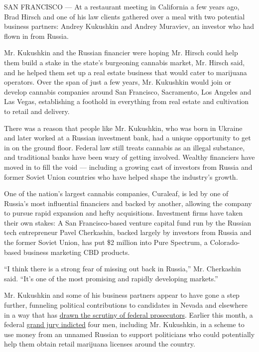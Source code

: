 SAN FRANCISCO --- At a restaurant meeting in California a few years ago,
Brad Hirsch and one of his law clients gathered over a meal with two
potential business partners: Andrey Kukushkin and Andrey Muraviev, an
investor who had flown in from Russia.

Mr. Kukushkin and the Russian financier were hoping Mr. Hirsch could
help them build a stake in the state's burgeoning cannabis market, Mr.
Hirsch said, and he helped them set up a real estate business that would
cater to marijuana operators. Over the span of just a few years, Mr.
Kukushkin would join or develop cannabis companies around San Francisco,
Sacramento, Los Angeles and Las Vegas, establishing a foothold in
everything from real estate and cultivation to retail and delivery.

There was a reason that people like Mr. Kukushkin, who was born in
Ukraine and later worked at a Russian investment bank, had a unique
opportunity to get in on the ground floor. Federal law still treats
cannabis as an illegal substance, and traditional banks have been wary
of getting involved. Wealthy financiers have moved in to fill the void
--- including a growing cast of investors from Russia and former Soviet
Union countries who have helped shape the industry's growth.

One of the nation's largest cannabis companies, Curaleaf, is led by one
of Russia's most influential financiers and backed by another, allowing
the company to pursue rapid expansion and hefty acquisitions. Investment
firms have taken their own stakes: A San Francisco-based venture capital
fund run by the Russian tech entrepreneur Pavel Cherkashin, backed
largely by investors from Russia and the former Soviet Union, has put
\$2 million into Pure Spectrum, a Colorado-based business marketing CBD
products.

``I think there is a strong fear of missing out back in Russia,'' Mr.
Cherkashin said. ``It's one of the most promising and rapidly developing
markets.''

Mr. Kukushkin and some of his business partners appear to have gone a
step further, funneling political contributions to candidates in Nevada
and elsewhere in a way that has
\href{https://www.nytimes.com/2019/10/10/us/politics/lev-parnas-igor-fruman-arrested-giuliani.html?module=inline}{drawn
the scrutiny of federal prosecutors}. Earlier this month, a federal
\href{https://int.nyt.com/data/documenthelper/1886-indictment-giuliani-associates/a5dd834e350dc3b860c2/optimized/full.pdf\#page=1}{grand
jury indicted} four men, including Mr. Kukushkin, in a scheme to use
money from an unnamed Russian to support politicians who could
potentially help them obtain retail marijuana licenses around the
country.


